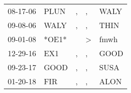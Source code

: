 \begin{supertabular}{p{0.07\textwidth}p{0.06\textwidth}p{0.02\textwidth}p{0.02\textwidth}p{0.06\textwidth}}
 08-17-06\textsuperscript{} &  PLUN\textsuperscript{} &  , &             , &  WALY\textsuperscript{} \\
 09-08-06\textsuperscript{} &  WALY\textsuperscript{} &  , &             , &  THIN\textsuperscript{} \\
 09-01-08\textsuperscript{} &                   *OE1* &    &  \textgreater &  fmwh\textsuperscript{} \\
 12-29-16\textsuperscript{} &   EX1\textsuperscript{} &  , &             , &  GOOD\textsuperscript{} \\
 09-23-17\textsuperscript{} &  GOOD\textsuperscript{} &  , &             , &  SUSA\textsuperscript{} \\
 01-20-18\textsuperscript{} &   FIR\textsuperscript{} &  , &             , &  ALON\textsuperscript{} \\
\end{supertabular}
